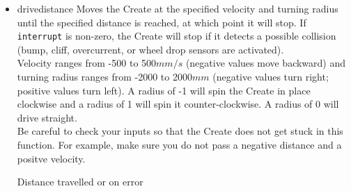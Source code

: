 \documentclass {article}
\begin{document}
\begin {itemize}
  \item {}
        {drivedistance}
        Moves the Create at the specified velocity and turning radius until the
        specified distance is reached, at which point it will stop. If {\tt interrupt} is non-zero,
        the Create will stop if it detects a possible collision (bump, cliff, overcurrent, or wheel
        drop sensors are activated). \\
        Velocity ranges from -500 to 500$mm/s$ (negative values move backward) and turning radius
        ranges from -2000 to 2000$mm$ (negative values turn right; positive values turn left).  
        A radius of -1 will spin the Create in place clockwise and a radius of 1 will spin it
        counter-clockwise.  A radius of 0 will drive straight. \\
        Be careful to check your inputs so that the Create does not get stuck in this function.  For
        example, make sure you do not pass a negative distance and a positve velocity. \\
        \ret Distance travelled or \fail on error


\end{itemize}
\end{document}
